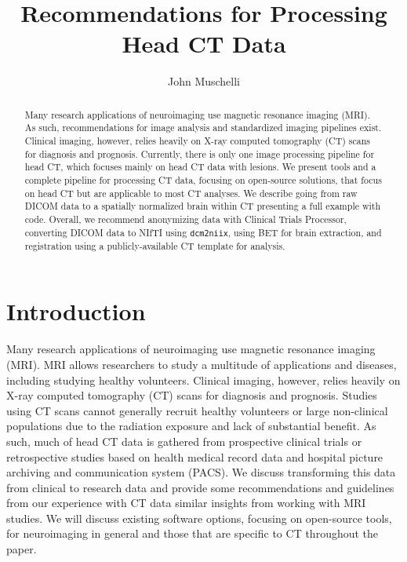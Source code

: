 \documentclass[]{elsarticle} %
\begin{document}
\begin{frontmatter}

  \title{Recommendations for Processing Head CT Data}
    \author[JHSPH]{John Muschelli}
  
      \address[JHSPH]{Johns Hopkins Bloomberg School of Public Health, Department of Biostatistics, 615 N Wolfe St, Baltimore, MD, 21205}
  
  \begin{abstract}
  Many research applications of neuroimaging use magnetic resonance imaging (MRI). As such, recommendations for image analysis and standardized imaging pipelines exist. Clinical imaging, however, relies heavily on X-ray computed tomography (CT) scans for diagnosis and prognosis. Currently, there is only one image processing pipeline for head CT, which focuses mainly on head CT data with lesions. We present tools and a complete pipeline for processing CT data, focusing on open-source solutions, that focus on head CT but are applicable to most CT analyses. We describe going from raw DICOM data to a spatially normalized brain within CT presenting a full example with code. Overall, we recommend anonymizing data with Clinical Trials Processor, converting DICOM data to NIfTI using \texttt{dcm2niix}, using BET for brain extraction, and registration using a publicly-available CT template for analysis.
  \end{abstract}
  
 \end{frontmatter}

\hypertarget{introduction}{%
\section{Introduction}\label{introduction}}

Many research applications of neuroimaging use magnetic resonance imaging (MRI). MRI allows researchers to study a multitude of applications and diseases, including studying healthy volunteers. Clinical imaging, however, relies heavily on X-ray computed tomography (CT) scans for diagnosis and prognosis. Studies using CT scans cannot generally recruit healthy volunteers or large non-clinical populations due to the radiation exposure and lack of substantial benefit. As such, much of head CT data is gathered from prospective clinical trials or retrospective studies based on health medical record data and hospital picture archiving and communication system (PACS). We discuss transforming this data from clinical to research data and provide some recommendations and guidelines from our experience with CT data similar insights from working with MRI studies. We will discuss existing software options, focusing on open-source tools, for neuroimaging in general and those that are specific to CT throughout the paper.
\end{document}
